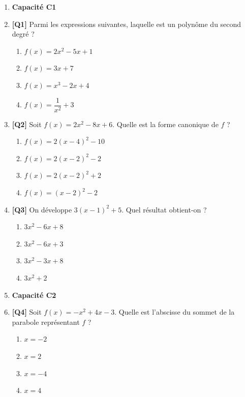 \begin{enumerate}

\item[] \textbf{Capacité C1}

\item \textbf{[Q1]} Parmi les expressions suivantes, laquelle est un polynôme du second degré ?
  \begin{enumerate}[label=\Alph*.]
    \item $f(x) = 2x^2 - 5x + 1$
    \item $f(x) = 3x + 7$
    \item $f(x) = x^3 - 2x + 4$
    \item $f(x) = \dfrac{1}{x^2} + 3$
  \end{enumerate}

\item \textbf{[Q2]} Soit $f(x) = 2x^2 - 8x + 6$. Quelle est la forme canonique de $f$ ?
  \begin{enumerate}[label=\Alph*.]
    \item $f(x) = 2(x - 4)^2 - 10$
    \item $f(x) = 2(x - 2)^2 - 2$
    \item $f(x) = 2(x - 2)^2 + 2$
    \item $f(x) = (x - 2)^2 - 2$
  \end{enumerate}

\item \textbf{[Q3]} On développe $3(x-1)^2 + 5$. Quel résultat obtient-on ?
  \begin{enumerate}[label=\Alph*.]
    \item $3x^2 - 6x + 8$
    \item $3x^2 - 6x + 3$
    \item $3x^2 - 3x + 8$
    \item $3x^2 + 2$
  \end{enumerate}

\item[] \textbf{Capacité C2}

\item \textbf{[Q4]} Soit $f(x) = -x^2 + 4x - 3$. Quelle est l'abscisse du sommet de la parabole représentant $f$ ?
  \begin{enumerate}[label=\Alph*.]
    \item $x = -2$
    \item $x = 2$
    \item $x = -4$
    \item $x = 4$
  \end{enumerate}


\end{enumerate}

